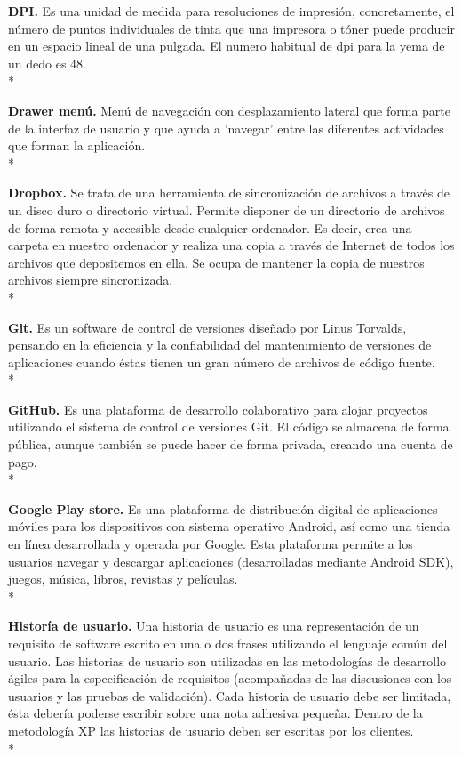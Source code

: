 \documentclass[../pfc.tex]{subfiles}
\begin{document}
	\textbf{DPI.}
	Es una unidad de medida para resoluciones de impresión, concretamente, el número de puntos individuales de tinta que una impresora o tóner puede producir en un espacio lineal de una pulgada.
	El numero habitual de dpi para la yema de un dedo es 48.\\*
	
	\textbf{Drawer menú.}
	Menú de navegación con desplazamiento lateral que forma parte de la interfaz de usuario y que ayuda a 'navegar' entre las diferentes actividades que forman la aplicación.\\*
	
	\textbf{Dropbox.}
	Se trata de una herramienta de sincronización de archivos a través de un disco duro o
	directorio virtual. Permite disponer de un directorio de archivos de forma remota y accesible desde
	cualquier ordenador. Es decir, crea una carpeta en nuestro ordenador y realiza una copia a través
	de Internet de todos los archivos que depositemos en ella. Se ocupa de mantener la copia de
	nuestros archivos siempre sincronizada.\\*
	
	\textbf{Git.}
	Es un software de control de versiones diseñado por Linus Torvalds, pensando en la eficiencia y la confiabilidad del mantenimiento de versiones de aplicaciones cuando éstas tienen un gran número de archivos de código fuente. \\*
	
	\textbf{GitHub.}
	Es una plataforma de desarrollo colaborativo para alojar proyectos utilizando el sistema de control de versiones Git.
	El código se almacena de forma pública, aunque también se puede hacer de forma privada, creando una cuenta de pago.\\*
	
	\textbf{Google Play store.}
	Es una plataforma de distribución digital de aplicaciones móviles para los dispositivos con sistema operativo Android, así como una tienda en línea desarrollada y operada por Google. Esta plataforma permite a los usuarios navegar y descargar aplicaciones (desarrolladas mediante Android SDK), juegos, música, libros, revistas y películas.\\*
	
	\textbf{Historía de usuario.}
	Una historia de usuario es una representación de un requisito de software escrito en una o dos frases utilizando el lenguaje común del usuario. Las historias de usuario son utilizadas en las metodologías de desarrollo ágiles para la especificación de requisitos (acompañadas de las discusiones con los usuarios y las pruebas de validación). Cada historia de usuario debe ser limitada, ésta debería poderse escribir sobre una nota adhesiva pequeña. Dentro de la metodología XP las historias de usuario deben ser escritas por los clientes.\\*
	
\end{document}

